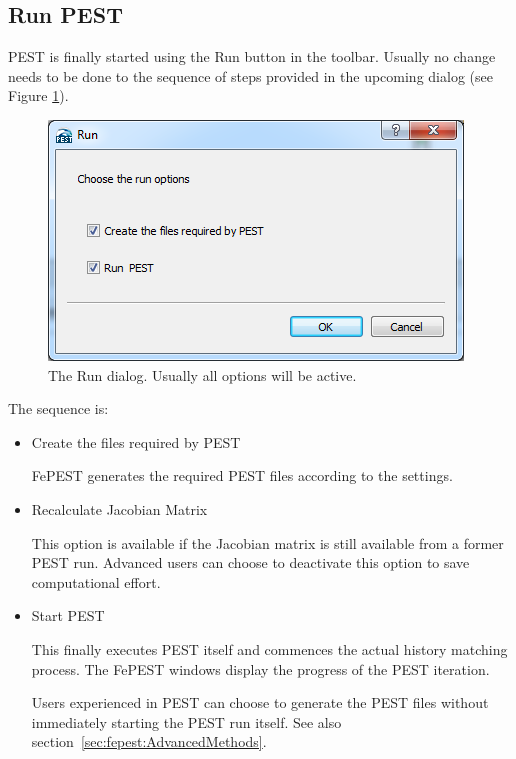 \subsection{Run PEST}

PEST is finally started using the Run button in the toolbar. Usually no change needs to be done to the sequence of steps provided in the upcoming dialog (see Figure \ref{fig:fepest:RunDialogCreateFilesAndRun}).


\begin{figure}
	\center
	\includegraphics[width=\columnwidth]{figures/RunDialogCreateFilesAndRun.png}
\caption{The Run dialog. Usually all options will be active.}
\label{fig:fepest:RunDialogCreateFilesAndRun}
\end{figure}

The sequence is:

\begin{itemize}
\item	Create the files required by PEST

FePEST generates the required PEST files according to the settings.

\item Recalculate Jacobian Matrix

This option is available if the Jacobian matrix is still available from a former PEST run. Advanced users can choose to deactivate this option to save computational effort.

\item Start PEST

This finally executes PEST itself and commences the actual history matching process. The FePEST windows display the progress of the PEST iteration.

Users experienced in PEST can choose to generate the PEST files without immediately starting the PEST run itself. See also section~\ref{sec:fepest:AdvancedMethods}.

\end{itemize}

